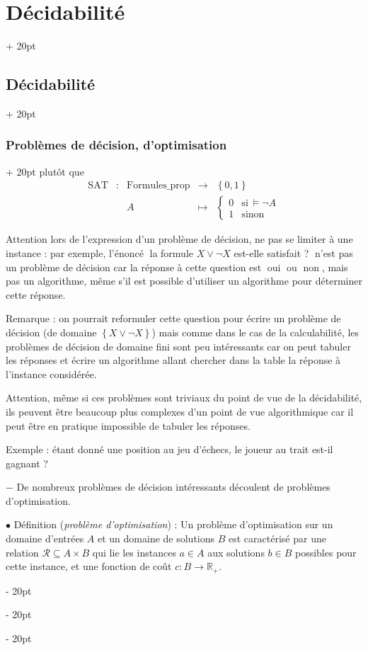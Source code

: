 \documentclass[a4paper, 12pt, twoside]{article}
\newcommand{\R}{\mathbb{R}} %
\newcommand{\set}[1]{\left\{ #1 \right\}}
\newcommand{\simplecit}[1]{\guillemotleft$\;$#1$\;$\guillemotright}
\newcommand{\ind}[1][20pt]{\advance\leftskip + #1}
\newcommand{\deind}[1][20pt]{\advance\leftskip - #1}
\newenvironment{indt}[2][20pt]{#2 \par \ind[#1]}{\par \deind} %
\begin{document}
\begin{indt}{\section{Décidabilité}}
\begin{indt}{\subsection{Décidabilité}}
\begin{indt}{\subsubsection{Problèmes de décision, d'optimisation}}
                plutôt que
                \[
                    \begin{array}{ccccl}
                        \mathrm{SAT}
                        & : & \mathrm{Formules\_prop}
                        & \longrightarrow & \set{0, 1}
                        \\
                        && A & \longmapsto &
                        \begin{cases}
                            0 & \text{si}\ \vDash \neg A
                            \\
                            1 & \text{sinon}
                        \end{cases}
                    \end{array}
                \]

                Attention lors de l'expression d'un problème de décision, ne pas se limiter à une instance : par exemple, l'énoncé \simplecit{la formule $X \vee \neg X$ est-elle satisfait ?} n'est pas un problème de décision car la réponse à cette question est \simplecit{oui} ou \simplecit{non}, mais pas un algorithme, même s'il est possible d'utiliser un algorithme pour déterminer cette réponse.

                Remarque : on pourrait reformuler cette question pour écrire un problème de décision (de domaine $\set{X \vee \neg X}$) mais comme dans le cas de la calculabilité, les problèmes de décision de domaine fini sont peu intéressants car on peut tabuler les réponses et écrire un algorithme allant chercher dans la table la réponse à l'instance considérée.

                Attention, même si ces problèmes sont triviaux du point de vue de la décidabilité, ils peuvent être beaucoup plus complexes d'un point de vue algorithmique car il peut être en pratique impossible de tabuler les réponses.

                Exemple : étant donné une position au jeu d'échecs, le joueur au trait est-il gagnant ?

                \vspace{6pt}
                
                $-$ De nombreux problèmes de décision intéressants découlent de problèmes d'optimisation.

                \vspace{12pt}
                
                $\bullet$ Définition (\textit{problème d'optimisation}) :
                Un problème d'optimisation sur un domaine d'entrées $A$ et un domaine de solutions $B$ est caractérisé par une relation $\mathcal R \subseteq A \times B$ qui lie les instances $a \in A$ aux solutions $b \in B$ possibles pour cette instance, et une fonction de coût $c : B \longrightarrow \R_+$.


\end{indt}
\end{indt}
\end{indt}
\end{document}
